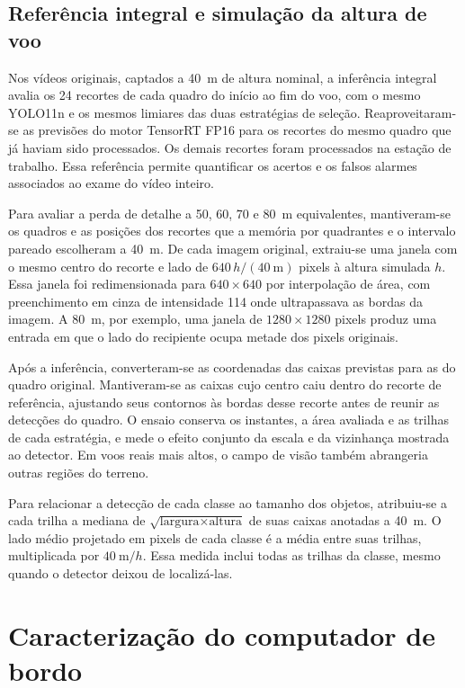 \subsection{Referência integral e simulação da altura de voo}
\label{sec_metodo_altura_integral}

Nos vídeos originais, captados a 40~m de altura nominal, a inferência integral avalia os 24 recortes de cada quadro do início ao fim do voo, com o mesmo YOLO11n e os mesmos limiares das duas estratégias de seleção. Reaproveitaram-se as previsões do motor TensorRT FP16 para os recortes do mesmo quadro que já haviam sido processados. Os demais recortes foram processados na estação de trabalho. Essa referência permite quantificar os acertos e os falsos alarmes associados ao exame do vídeo inteiro.

Para avaliar a perda de detalhe a 50, 60, 70 e 80~m equivalentes, mantiveram-se os quadros e as posições dos recortes que a memória por quadrantes e o intervalo pareado escolheram a 40~m. De cada imagem original, extraiu-se uma janela com o mesmo centro do recorte e lado de $640\,h/(40~\mathrm{m})$ pixels à altura simulada $h$. Essa janela foi redimensionada para $640\times640$ por interpolação de área, com preenchimento em cinza de intensidade 114 onde ultrapassava as bordas da imagem. A 80~m, por exemplo, uma janela de $1280\times1280$ pixels produz uma entrada em que o lado do recipiente ocupa metade dos pixels originais.

Após a inferência, converteram-se as coordenadas das caixas previstas para as do quadro original. Mantiveram-se as caixas cujo centro caiu dentro do recorte de referência, ajustando seus contornos às bordas desse recorte antes de reunir as detecções do quadro. O ensaio conserva os instantes, a área avaliada e as trilhas de cada estratégia, e mede o efeito conjunto da escala e da vizinhança mostrada ao detector. Em voos reais mais altos, o campo de visão também abrangeria outras regiões do terreno.

Para relacionar a detecção de cada classe ao tamanho dos objetos, atribuiu-se a cada trilha a mediana de $\sqrt{\text{largura}\times\text{altura}}$ de suas caixas anotadas a 40~m. O lado médio projetado em pixels de cada classe é a média entre suas trilhas, multiplicada por $40~\mathrm{m}/h$. Essa medida inclui todas as trilhas da classe, mesmo quando o detector deixou de localizá-las.

\section{Caracterização do computador de bordo}
\label{sec_metodo_jetson}

